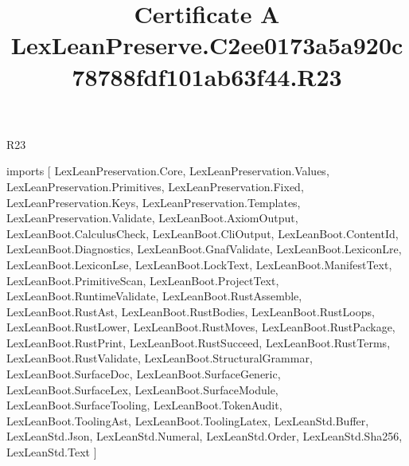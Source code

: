 \begin{lexlean}{R23}
\title{Certificate A LexLeanPreserve.C2ee0173a5a920c78788fdf101ab63f44.R23}
\begin{coremodule}
imports [
  LexLeanPreservation.Core,
  LexLeanPreservation.Values,
  LexLeanPreservation.Primitives,
  LexLeanPreservation.Fixed,
  LexLeanPreservation.Keys,
  LexLeanPreservation.Templates,
  LexLeanPreservation.Validate,
  LexLeanBoot.AxiomOutput,
  LexLeanBoot.CalculusCheck,
  LexLeanBoot.CliOutput,
  LexLeanBoot.ContentId,
  LexLeanBoot.Diagnostics,
  LexLeanBoot.GnafValidate,
  LexLeanBoot.LexiconLre,
  LexLeanBoot.LexiconLse,
  LexLeanBoot.LockText,
  LexLeanBoot.ManifestText,
  LexLeanBoot.PrimitiveScan,
  LexLeanBoot.ProjectText,
  LexLeanBoot.RuntimeValidate,
  LexLeanBoot.RustAssemble,
  LexLeanBoot.RustAst,
  LexLeanBoot.RustBodies,
  LexLeanBoot.RustLoops,
  LexLeanBoot.RustLower,
  LexLeanBoot.RustMoves,
  LexLeanBoot.RustPackage,
  LexLeanBoot.RustPrint,
  LexLeanBoot.RustSucceed,
  LexLeanBoot.RustTerms,
  LexLeanBoot.RustValidate,
  LexLeanBoot.StructuralGrammar,
  LexLeanBoot.SurfaceDoc,
  LexLeanBoot.SurfaceGeneric,
  LexLeanBoot.SurfaceLex,
  LexLeanBoot.SurfaceModule,
  LexLeanBoot.SurfaceTooling,
  LexLeanBoot.TokenAudit,
  LexLeanBoot.ToolingAst,
  LexLeanBoot.ToolingLatex,
  LexLeanStd.Buffer,
  LexLeanStd.Json,
  LexLeanStd.Numeral,
  LexLeanStd.Order,
  LexLeanStd.Sha256,
  LexLeanStd.Text
]


\end{coremodule}
\end{lexlean}
